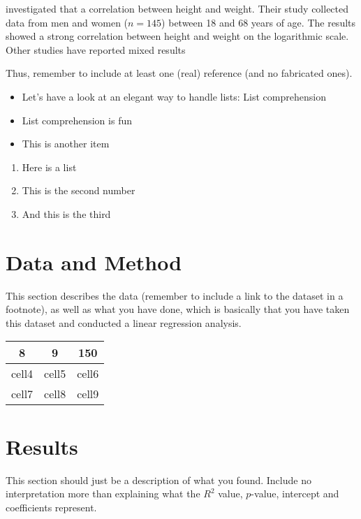 \documentclass[a4paper,12pt]{article}
\begin{document}
\cite{doe2020} investigated that a correlation between height and weight. Their study collected data from men and women ($n=145$) between 18 and 68 years of age. The results showed a strong correlation between height and weight on the logarithmic scale. Other studies have reported mixed results  \citep{lizadaughter2000, nick2023}

Thus, remember to include at least one (real) reference (and no fabricated ones).

            \begin{itemize}
    \item Let's have a look at an elegant
        way to handle lists: List comprehension
        \item List comprehension is fun
        \item This is another item
        \end{itemize}

        \begin{enumerate}
            \item Here is a list
            \item This is the second number
            \item And this is the third
        \end{enumerate}

\section{Data and Method}

This section describes the data (remember to include a link to the dataset in a footnote), as well as what you have done, which is basically that you have taken this dataset and conducted a linear regression analysis.

\begin{center}
\begin{tabular}{ | c | c | c | }
 8 & 9 & 150 \\
 \hline
 cell4 & cell5 & cell6 \\  
 \hline
 cell7 & cell8 & cell9  \\
\end{tabular}
\end{center}

\section{Results}
This section should just be a description of what you found. Include no interpretation more than explaining what the $R^2$ value, $p$-value, intercept and coefficients represent.
\end{document}
